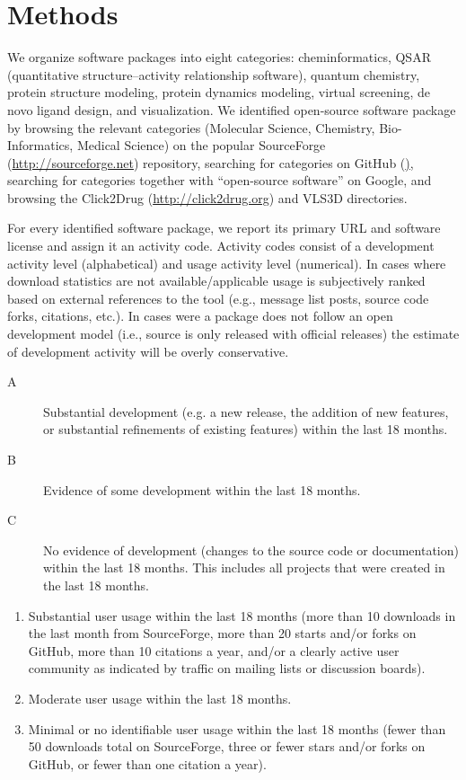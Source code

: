 \section{Methods}

We organize software packages into eight categories: cheminformatics, QSAR (quantitative structure–activity relationship software), quantum chemistry, protein structure modeling, protein dynamics modeling, virtual screening, de novo ligand design, and visualization.
We identified open-source software package by browsing the relevant categories (Molecular Science, Chemistry, Bio-Informatics, Medical Science) on the popular SourceForge (\url{http://sourceforge.net}) repository, searching for categories on GitHub (\href{http://github.com}), searching for categories together with ``open-source software'' on Google, and browsing the Click2Drug (\url{http://click2drug.org}) and VLS3D \cite{Villoutreix_2013} directories.

For every identified software package, we report its primary URL and software license and assign it an activity code. Activity codes consist of a development activity level (alphabetical) and usage activity level (numerical). In cases where download statistics are not available/applicable usage is subjectively ranked based on external references to the tool (e.g., message list posts, source code forks, citations, etc.).  In cases were a package does not follow an open development model (i.e., source is only released with official releases) the estimate of development activity will be overly conservative.

\begin{description}
  \item[A] Substantial development (e.g. a new release, the addition of new features, or substantial refinements of existing features) within the last 18 months.
  \item[B] Evidence of some development within the last 18 months.
  \item[C] No evidence of development (changes to the source code or documentation) within the last 18 months. This includes all projects that were created in the last 18 months.
\end{description}
\begin{enumerate}
  \item Substantial user usage within the last 18 months (more than 10 downloads in the last month from SourceForge, more than 20 starts and/or forks on GitHub, more than 10 citations a year, and/or a clearly active user community as indicated by traffic on mailing lists or discussion boards).
  \item Moderate user usage within the last 18 months.
    \item Minimal or no identifiable user usage within the last 18 months (fewer than 50 downloads total on SourceForge, three or fewer stars and/or forks on GitHub, or fewer than one citation a year).
\end{enumerate}

